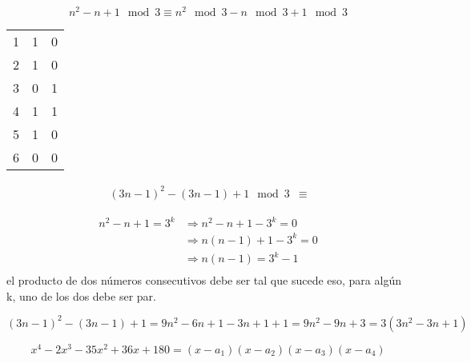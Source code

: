 \documentclass[12pt]{report}
\theoremstyle{largebreak}
\begin{document}
    \begin{sol}
        \begin{equation*}
            n^2-n+1 \mod 3 \equiv n^2\mod 3-n\mod 3+1\mod 3
        \end{equation*}

        \begin{tabular}{ccc}
            1 & 1 & 0 \\
            2 & 1 & 0 \\
            3 & 0 & 1 \\
            4 & 1 & 1 \\
            5 & 1 & 0 \\
            6 & 0 & 0 \\
        \end{tabular}

        \begin{equation*}
            \begin{split}
                (3n-1)^2-(3n-1)+1 \mod 3 &\equiv
            \end{split}
        \end{equation*}

        \begin{equation*}
            \begin{split}
                n^2-n+1=3^k&\Rightarrow n^2-n+1-3^k=0\\
                &\Rightarrow n(n-1)+1-3^k=0\\
                &\Rightarrow n(n-1)=3^k-1\\
            \end{split}
        \end{equation*}
        el producto de dos números consecutivos debe ser tal que sucede eso, para algún k, uno de los dos debe ser par.

        \begin{equation*}
            (3n-1)^2-(3n-1)+1=9n^2-6n+1-3n+1+1=9n^2-9n+3=3(3n^2-3n+1)
        \end{equation*}

    \end{sol}

    \begin{excer}
        \begin{equation*}
            x^4-2x^3-35x^2+36x+180=(x-a_1)(x-a_2)(x-a_3)(x-a_4)
        \end{equation*}
    \end{excer}
\end{document}

